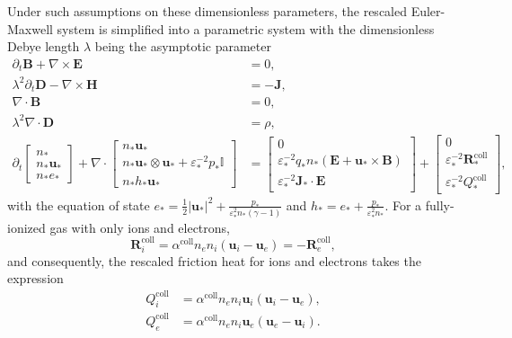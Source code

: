 \documentclass{article}
\begin{document}
Under such assumptions on these dimensionless parameters, the rescaled Euler-Maxwell system is simplified into a parametric system with the dimensionless Debye length $\lambda$ being the asymptotic parameter
\begin{subequations}
\begin{align}
    \partial_t \mathbf{B} + \nabla \times \mathbf{E} &= 0, \label{equ:maxwell_faraday_rescaled} \\ 
    \lambda^2 \partial_t \mathbf{D} - \nabla \times \mathbf{H} &= - \mathbf{J}, \label{equ:maxwell_ampere_rescaled} \\
    \nabla \cdot \mathbf{B} &= 0,  \label{equ:maxwell_gauss_B_rescaled}\\
    \lambda^2 \nabla \cdot \mathbf{D} &= \rho, \label{equ:maxwell_gauss_D_rescaled} \\
    \partial_t
    \begin{bmatrix}
    n_* \\
    n_* \mathbf{u}_* \\
    n_* e_*
    \end{bmatrix}
    + \nabla \cdot
    \begin{bmatrix}
    n_* \mathbf{u}_* \\
    n_* \mathbf{u}_* \otimes \mathbf{u}_* + \varepsilon_*^{-2} p_*\mathbb{I} \\
    n_* h_* \mathbf{u}_*
    \end{bmatrix}
    &=
    \begin{bmatrix}
    0 \\
    \varepsilon_*^{-2} q_* n_* (\mathbf{E} + \mathbf{u}_* \times \mathbf{B}) \\
    \varepsilon_*^{-2} \mathbf{J}_* \cdot \mathbf{E}
    \end{bmatrix}+
    \begin{bmatrix}
    0 \\
    \varepsilon_*^{-2}\mathbf{R}_*^{\text{coll}} \\
    \varepsilon_*^{-2}Q_*^{\text{coll}} 
    \end{bmatrix}, \label{equ:euler_rescaled}
\end{align}
\end{subequations}
with the equation of state $e_* = \frac{1}{2}|\mathbf{u_*}|^2 + \frac{p_*}{\varepsilon^2_* n_* (\gamma - 1)}$ and $h_* = e_* + \frac{p_*}{\varepsilon^2_* n_*}$. For a fully-ionized gas with only ions and electrons, 
\begin{equation} \label{equ:collision_rescaled} 
    \mathbf{R}_i^{\text{coll}} = \alpha^{\text{coll}}n_en_i(\mathbf{u}_i - \mathbf{u}_e) = - \mathbf{R}_e^{\text{coll}},
\end{equation}
and consequently, the rescaled friction heat for ions and electrons takes the expression
\begin{align*} 
    Q_i^{\text{coll}} &= \alpha^{\text{coll}}n_en_i \mathbf{u}_i (\mathbf{u}_i - \mathbf{u}_e), \\
    Q_e^{\text{coll}} &= \alpha^{\text{coll}}n_en_i \mathbf{u}_e (\mathbf{u}_e - \mathbf{u}_i).
\end{align*}
\end{document}
